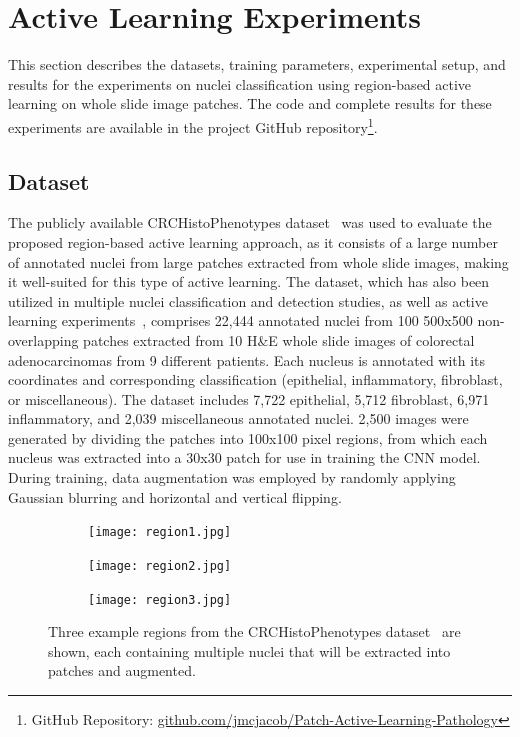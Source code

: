 \section{Active Learning Experiments}
\label{sec:active_experiments}
This section describes the datasets, training parameters, experimental setup, and results for the experiments on nuclei classification using region-based active learning on whole slide image patches. The code and complete results for these experiments are available in the project GitHub repository\footnote{GitHub Repository: \url{github.com/jmcjacob/Patch-Active-Learning-Pathology}}.

\subsection{Dataset}
\label{subsec:active_dataset}
The publicly available CRCHistoPhenotypes dataset~\citep{sirinukunwattana2016locality} was used to evaluate the proposed region-based active learning approach, as it consists of a large number of annotated nuclei from large patches extracted from whole slide images, making it well-suited for this type of active learning. The dataset, which has also been utilized in multiple nuclei classification and detection studies, as well as active learning experiments~\citep{shao2018deep}, comprises 22,444 annotated nuclei from 100 500x500 non-overlapping patches extracted from 10 H\&E whole slide images of colorectal adenocarcinomas from 9 different patients. Each nucleus is annotated with its coordinates and corresponding classification (epithelial, inflammatory, fibroblast, or miscellaneous). The dataset includes 7,722 epithelial, 5,712 fibroblast, 6,971 inflammatory, and 2,039 miscellaneous annotated nuclei. 2,500 images were generated by dividing the patches into 100x100 pixel regions, from which each nucleus was extracted into a 30x30 patch for use in training the CNN model. During training, data augmentation was employed by randomly applying Gaussian blurring and horizontal and vertical flipping.

\begin{figure}[t!]
	\centering
	\begin{subfigure}{0.3\textwidth}
		\texttt{[image: region1.jpg]}
	\end{subfigure}
	\begin{subfigure}{0.3\textwidth}
		\texttt{[image: region2.jpg]}
	\end{subfigure}
	\begin{subfigure}{0.3\textwidth}
		\texttt{[image: region3.jpg]}
	\end{subfigure}
	\caption{Three example regions from the CRCHistoPhenotypes dataset~\cite{sirinukunwattana2016locality} are shown, each containing multiple nuclei that will be extracted into patches and augmented.}
	\label{fig:region_example}
\end{figure}

